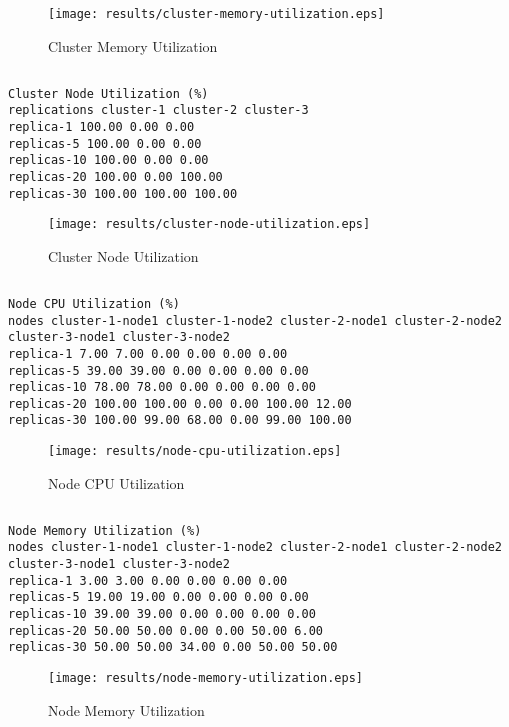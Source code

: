 \documentclass{elsart}
\begin{document}
\begin{figure}[ht]
\centering
\texttt{[image: results/cluster-memory-utilization.eps]}
\caption{Cluster Memory Utilization}\label{fig:cluster-memory-utilization.eps}
\end{figure}

\subsection{}

\begin{lstlisting}[caption={Cluster Node Utilization}]
Cluster Node Utilization (%)
replications cluster-1 cluster-2 cluster-3
replica-1 100.00 0.00 0.00
replicas-5 100.00 0.00 0.00
replicas-10 100.00 0.00 0.00
replicas-20 100.00 0.00 100.00
replicas-30 100.00 100.00 100.00
\end{lstlisting}

\begin{figure}[ht]
\centering
\texttt{[image: results/cluster-node-utilization.eps]}
\caption{Cluster Node Utilization}\label{fig:cluster-node-utilization.eps}
\end{figure}

\subsection{}

\begin{lstlisting}[caption={Node CPU Utilization}]
Node CPU Utilization (%)
nodes cluster-1-node1 cluster-1-node2 cluster-2-node1 cluster-2-node2 cluster-3-node1 cluster-3-node2
replica-1 7.00 7.00 0.00 0.00 0.00 0.00
replicas-5 39.00 39.00 0.00 0.00 0.00 0.00
replicas-10 78.00 78.00 0.00 0.00 0.00 0.00
replicas-20 100.00 100.00 0.00 0.00 100.00 12.00
replicas-30 100.00 99.00 68.00 0.00 99.00 100.00
\end{lstlisting}

\begin{figure}[ht]
\centering
\texttt{[image: results/node-cpu-utilization.eps]}
\caption{Node CPU Utilization}\label{fig:node-cpu-utilization.eps}
\end{figure}

\subsection{}

\begin{lstlisting}[caption={Node Memory Utilization}]
Node Memory Utilization (%)
nodes cluster-1-node1 cluster-1-node2 cluster-2-node1 cluster-2-node2 cluster-3-node1 cluster-3-node2
replica-1 3.00 3.00 0.00 0.00 0.00 0.00
replicas-5 19.00 19.00 0.00 0.00 0.00 0.00
replicas-10 39.00 39.00 0.00 0.00 0.00 0.00
replicas-20 50.00 50.00 0.00 0.00 50.00 6.00
replicas-30 50.00 50.00 34.00 0.00 50.00 50.00
\end{lstlisting}

\begin{figure}[ht]
\centering
\texttt{[image: results/node-memory-utilization.eps]}
\caption{Node Memory Utilization}\label{fig:node-memory-utilization.eps}
\end{figure}
\end{document}
